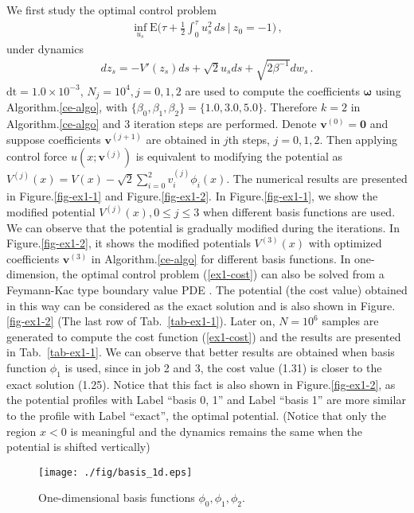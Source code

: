 \documentclass[final]{siamltex}
\begin{document}
We first study the optimal control problem  
\begin{align}
  \inf_{u_s} \mathrm{E} \Big(\tau + \frac{1}{2} \int_0^\tau u_s^2 \,ds~\Big|~
  z_0 = -1\Big)\,,
  \label{ex1-cost}
\end{align}
under dynamics
\begin{align}
  dz_s = - V'(z_s) ds + \sqrt{2}u_s ds + \sqrt{2\beta^{-1}} dw_s\,.
\end{align}
$\mbox{dt} = 1.0 \times 10^{-3}$, $N_j = 10^{4}, j=0,1,2$ are used to compute the
coefficients $\bm{\omega}$ using Algorithm.\ref{ce-algo}, with $\{\beta_0,\beta_1, \beta_2\}
= \{1.0, 3.0, 5.0\}$.  Therefore $k=2$ in Algorithm.\ref{ce-algo} and $3$
iteration steps are performed. Denote $\bm{v}^{(0)} = \bm{0}$ and suppose
coefficients $\bm{v}^{(j+1)}$ are obtained
in $j$th steps, $j=0,1,2$. Then applying control force $u(x;\bm{v}^{(j)})$ is
equivalent to modifying the potential as $V^{(j)}(x) = V(x) - \sqrt{2}\sum\limits_{i=0}^{2} v^{(j)}_i
\phi_i(x)$. The numerical results are presented in Figure.\ref{fig-ex1-1} and Figure.\ref{fig-ex1-2}.
In Figure.\ref{fig-ex1-1}, we show the modified potential $V^{(j)}(x), 0\le
j\le 3$ when different basis functions are used. We can observe that the potential is
gradually modified during the iterations. In Figure.\ref{fig-ex1-2}, it shows
the modified potentials $V^{(3)}(x)$ with optimized coefficients
$\bm{v}^{(3)}$ in Algorithm.\ref{ce-algo} for different basis functions. In
one-dimension, the optimal control problem (\ref{ex1-cost}) can also be solved
from a Feymann-Kac type boundary value PDE \cite{control_schuette}. The
potential (the cost value) obtained in this way can be considered as the exact solution and is also
shown in Figure.\ref{fig-ex1-2} (The last row of Tab.~\ref{tab-ex1-1}).
Later on, $N = 10^{6}$ samples are generated to compute
the cost function (\ref{ex1-cost}) and the results are presented in
Tab.~\ref{tab-ex1-1}. We can observe that better results are obtained when basis function
$\phi_1$ is used, since in job 2 and 3, the cost value (1.31) is closer to the exact
solution (1.25). Notice that this fact is also shown in
Figure.\ref{fig-ex1-2}, as the potential profiles with Label ``basis 0, 1'' and
Label ``basis 1'' are more similar to the profile with Label ``exact'', the
optimal potential. (Notice that only the region $x<0$ is meaningful and the dynamics remains the same when
the potential is shifted vertically) 
\begin{figure}[tphb]
  \centering
\texttt{[image: ./fig/basis\_1d.eps]}
\caption{One-dimensional basis functions $\phi_0, \phi_1, \phi_2$. \label{fig-ex1-basis}}
\end{figure}
\end{document}
